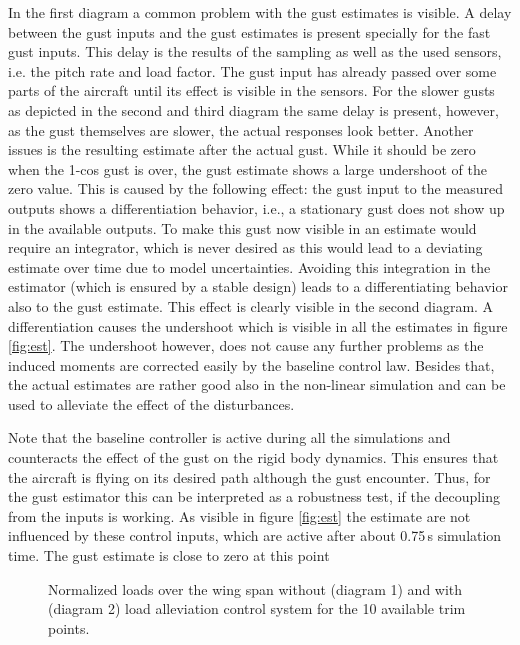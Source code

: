 \documentclass[graybox]{svmult}
\begin{document}
In the first diagram a common problem with the gust estimates is visible. A  delay between the gust inputs and the gust estimates is present specially for the fast gust inputs. This delay is the results of the sampling as well as the used sensors, i.e. the pitch rate and load factor. The gust input has already passed over some parts of the aircraft until its effect is visible in the sensors. For the slower gusts as depicted in the second and third diagram the same delay is present, however, as the gust themselves are slower, the actual responses look better.
Another issues is the resulting estimate after the actual gust. While it should be zero when the 1-cos gust is over, the gust estimate shows a large undershoot of the zero value. This is caused by the following effect: the gust input to the measured outputs shows a differentiation behavior, i.e., a stationary gust does not show up in the available outputs. To make this gust now visible in an estimate would require an integrator, which is never desired as this would lead to a deviating estimate over time due to model uncertainties. Avoiding this integration in the estimator (which is ensured by a stable design) leads to a differentiating behavior also to the gust estimate. This effect is clearly visible in the second diagram. A differentiation causes the undershoot which is visible in all the estimates in figure  \ref{fig:est}. The undershoot however, does not cause any further problems as the induced moments are corrected easily by the baseline control law.
Besides that, the actual estimates are rather good also in the non-linear simulation and can be used to alleviate the effect of the disturbances.

Note that the baseline controller is active during all the simulations and counteracts the effect of the gust on the rigid body dynamics. This ensures that the aircraft is flying on its desired path although the gust encounter. Thus, for the gust estimator this can be interpreted as a robustness test, if the decoupling from the inputs is working. As visible in figure \ref{fig:est} the estimate are not influenced by these control inputs, which are active after about 0.75\,s simulation time. The gust estimate is close to zero at this point

\begin{figure}[bth]
	\sidecaption[]
	
	\caption{Normalized loads over the wing span without (diagram 1) and with (diagram 2) load alleviation control system  for the 10 available trim points.}
	\label{fig:loads}	
\end{figure}
\end{document}
